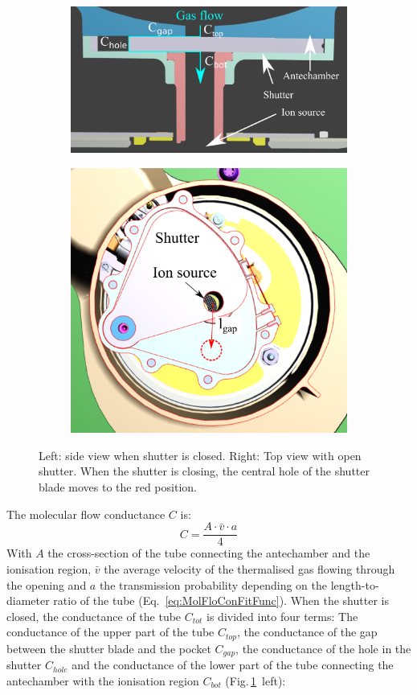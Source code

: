 	\begin{figure}[h!]
		\begin{subfigure}{0.5\textwidth}
			\centering
			\includegraphics[width=\textwidth]{Bilder/Shutter_sideview.png}
		\end{subfigure}
		\begin{subfigure}{0.5\textwidth}
			\centering
			\includegraphics[width=.8\textwidth]{Bilder/Shutter_topview.png}
		\end{subfigure}
	\caption{Left: side view when shutter is closed. Right: Top view with open shutter. When the shutter is closing, the central hole of the shutter blade moves to the red position.}
	\label{fig:shutterMotor}
	\end{figure}
	The molecular flow conductance $C$ is:
	\begin{equation}
		C = \frac{A\cdot\bar{v}\cdot a}{4}
	\end{equation}
	With $A$ the cross-section of the tube connecting the antechamber and the ionisation region, $\bar{v}$ the average velocity of the thermalised gas flowing through the opening and $a$ the transmission probability depending on the length-to-diameter ratio of the tube (Eq.~\eqref{eq:MolFloConFitFunc}). When the shutter is closed, the conductance of the tube $C_{tot}$ is divided into four terms: The conductance of the upper part of the tube $C_{top}$, the conductance of the gap between the shutter blade and the pocket $C_{gap}$, the conductance of the hole in the shutter $C_{hole}$ and the conductance of the lower part of the tube connecting the antechamber with the ionisation region $C_{bot}$ (Fig.\,\ref{fig:shutterMotor}~left):
